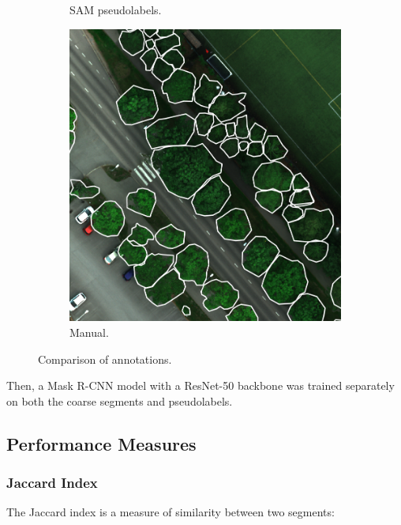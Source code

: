 \documentclass[english, 12pt, a4paper, sci, utf8, a-2b, online]{aaltothesis}
\begin{document}
\begin{figure}[h]
\begin{subfigure}[b]{0.32\textwidth}
        \caption{SAM pseudolabels.}
    \end{subfigure}
    \begin{subfigure}[b]{0.32\textwidth}
        \includegraphics[width=1.0\textwidth]{figures/annotations/manual.png}
        \caption{Manual.}
    \end{subfigure}
    \caption{Comparison of annotations.}
    \label{fig:annotation-comparison}
\end{figure}

Then, a Mask R-CNN model with a ResNet-50 \cite{resnet} backbone was trained separately on both the coarse segments and pseudolabels.

\newpage


\subsection{Performance Measures}

\subsubsection{Jaccard Index}

The Jaccard index\cite{jaccard} is a measure of similarity between two segments:
\end{document}
